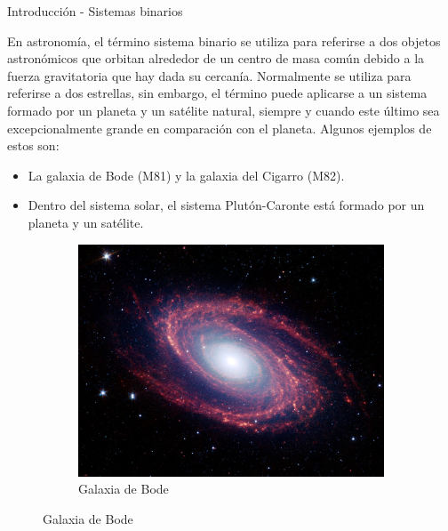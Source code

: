 \begin{frame}{Introducción - Sistemas binarios}
    \begin{minipage}{0.70\linewidth}
        En astronomía, el término sistema binario se utiliza para referirse a dos objetos 
        astronómicos que orbitan alrededor de un centro de masa común debido a la fuerza
        gravitatoria que hay dada su cercanía. Normalmente se utiliza para referirse a dos
        estrellas, sin embargo, el término puede aplicarse a un sistema formado por un
        planeta y un satélite natural, siempre y cuando este último sea excepcionalmente
        grande en comparación con el planeta. Algunos ejemplos de estos son:
        \begin{itemize}
            \item La galaxia de Bode (M81) y la galaxia del Cigarro (M82).
            \item Dentro del sistema solar, el sistema Plutón-Caronte está formado por un
            planeta y un satélite.
        \end{itemize}
    \end{minipage}
    \hspace{1cm}
    \begin{minipage}{0.20\linewidth}
        \vspace{0.5cm}
        \begin{figure}[H]
            \centering
            \begin{subfigure}{1\linewidth}
                \centering
                \includegraphics[scale=0.3]{images/bode.jpg}
                \caption{Galaxia de Bode}
            \end{subfigure}

\end{figure}
\end{minipage}
\end{frame}
